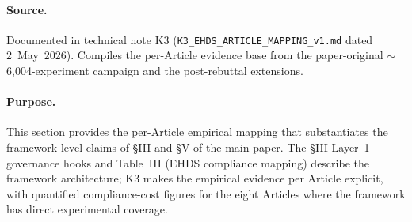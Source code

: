 \documentclass[conference]{IEEEtran}
\begin{document}
\paragraph{Source.} Documented in technical note K3 (\texttt{K3\_EHDS\_ARTICLE\_MAPPING\_v1.md} dated 2~May~2026). Compiles the per-Article evidence base from the paper-original $\sim$6{,}004-experiment campaign and the post-rebuttal extensions.

\paragraph{Purpose.} This section provides the per-Article empirical mapping that substantiates the framework-level claims of §III and §V of the main paper. The §III Layer~1 governance hooks and Table~III (EHDS compliance mapping) describe the framework architecture; K3 makes the empirical evidence per Article explicit, with quantified compliance-cost figures for the eight Articles where the framework has direct experimental coverage.
\end{document}
